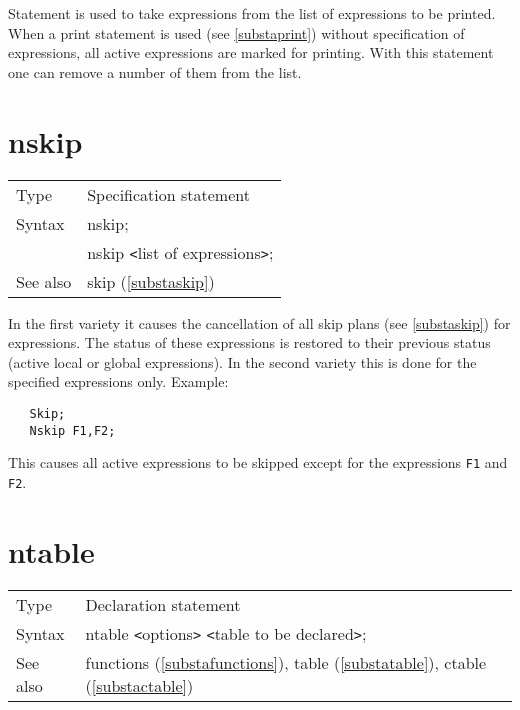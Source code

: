 \noindent Statement is used to take expressions from the list 
of expressions to be printed. When a print statement is used 
(see \ref{substaprint}) without specification of expressions, all active 
expressions are marked for printing. With this statement one can remove a 
number of them from the list. \vspace{10mm}


\section{nskip}
\label{substanskip}

\noindent \begin{tabular}{ll}
Type & Specification statement\\
Syntax & nskip; \\
       & nskip {\tt<}list of expressions{\tt>};
\\ See also & skip (\ref{substaskip})
\end{tabular} \vspace{4mm}

\noindent In the first variety it causes the cancellation of 
all skip plans (see \ref{substaskip}) for expressions. The 
status of these expressions is restored to their previous status (active 
local or global expressions). In the second variety this is done for the 
specified expressions only. Example:
\begin{verbatim}
   Skip;
   Nskip F1,F2;
\end{verbatim}
This causes all active expressions to be skipped except for the expressions 
\verb:F1: and \verb:F2:. \vspace{10mm}


\section{ntable}
\label{substantable}

\noindent \begin{tabular}{ll}
Type & Declaration statement\\
Syntax & ntable {\tt<}options{\tt>} {\tt<}table to be 
declared{\tt>}; \\
See also & functions (\ref{substafunctions}), table (\ref{substatable}),
        ctable (\ref{substactable})
\end{tabular} \vspace{4mm}

